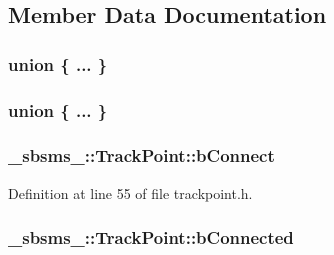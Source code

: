 \subsection{Member Data Documentation}
\subsubsection[{\texorpdfstring{"@249}{@249}}]{\setlength{\rightskip}{0pt plus 5cm}union \{ ... \} \hspace{0.3cm}{\ttfamily [protected]}}\hypertarget{class__sbsms___1_1_track_point_a4427d7f6ffc59a1556d799497ac42813}{}\label{class__sbsms___1_1_track_point_a4427d7f6ffc59a1556d799497ac42813}
\subsubsection[{\texorpdfstring{"@251}{@251}}]{\setlength{\rightskip}{0pt plus 5cm}union \{ ... \} \hspace{0.3cm}{\ttfamily [protected]}}\hypertarget{class__sbsms___1_1_track_point_a56c4dfe98135b983f58029743923170d}{}\label{class__sbsms___1_1_track_point_a56c4dfe98135b983f58029743923170d}
\subsubsection[{\texorpdfstring{b\+Connect}{bConnect}}]{ \+\_\+sbsms\+\_\+\+::\+Track\+Point\+::b\+Connect\hspace{0.3cm}{\ttfamily [protected]}}\hypertarget{class__sbsms___1_1_track_point_a10be7fd17a0d53c36c03a05738011c46}{}\label{class__sbsms___1_1_track_point_a10be7fd17a0d53c36c03a05738011c46}


Definition at line 55 of file trackpoint.\+h.

\subsubsection[{\texorpdfstring{b\+Connected}{bConnected}}]{ \+\_\+sbsms\+\_\+\+::\+Track\+Point\+::b\+Connected\hspace{0.3cm}{\ttfamily [protected]}}\hypertarget{class__sbsms___1_1_track_point_a3eaa9c8c84f1c1493e2de6058ad597d8}{}\label{class__sbsms___1_1_track_point_a3eaa9c8c84f1c1493e2de6058ad597d8}



